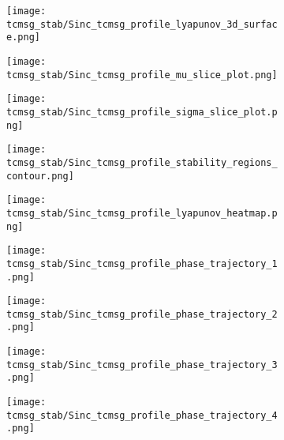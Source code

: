 \begin{figure}[H]
    \centering
    \begin{subfigure}[b]{0.31\textwidth}
        \centering
        \texttt{[image: tcmsg\_stab/Sinc\_tcmsg\_profile\_lyapunov\_3d\_surface.png]}
        \label{fig:tcmsg_stability1}
        \caption{}
    \end{subfigure}
    \begin{subfigure}[b]{0.31\textwidth}
        \centering
        \texttt{[image: tcmsg\_stab/Sinc\_tcmsg\_profile\_mu\_slice\_plot.png]}
        \label{fig:tcmsg_stability2}
        \caption{}
    \end{subfigure}
    \begin{subfigure}[b]{0.31\textwidth}
        \centering
        \texttt{[image: tcmsg\_stab/Sinc\_tcmsg\_profile\_sigma\_slice\_plot.png]}
        \label{fig:tcmsg_stability3}
        \caption{}
    \end{subfigure}
    
    \vspace{0.2cm} %
    
    \begin{subfigure}[b]{0.31\textwidth}
        \centering
        \texttt{[image: tcmsg\_stab/Sinc\_tcmsg\_profile\_stability\_regions\_contour.png]}
        \label{fig:tcmsg_stability4}
        \caption{}
    \end{subfigure}
    \begin{subfigure}[b]{0.31\textwidth}
        \centering
        \texttt{[image: tcmsg\_stab/Sinc\_tcmsg\_profile\_lyapunov\_heatmap.png]}
        \label{fig:tcmsg_stability5}
        \caption{}
    \end{subfigure}
    \begin{subfigure}[b]{0.31\textwidth}
        \centering
        \texttt{[image: tcmsg\_stab/Sinc\_tcmsg\_profile\_phase\_trajectory\_1.png]}
        \label{fig:tcmsg_stability6}
        \caption{}
    \end{subfigure}
    
    \vspace{0.2cm} %
    
    \begin{subfigure}[b]{0.31\textwidth}
        \centering
        \texttt{[image: tcmsg\_stab/Sinc\_tcmsg\_profile\_phase\_trajectory\_2.png]}
        \label{fig:tcmsg_stability7}
        \caption{}
    \end{subfigure}
    \begin{subfigure}[b]{0.31\textwidth}
        \centering
        \texttt{[image: tcmsg\_stab/Sinc\_tcmsg\_profile\_phase\_trajectory\_3.png]}
        \label{fig:tcmsg_stability8}
        \caption{}
    \end{subfigure}
    \begin{subfigure}[b]{0.31\textwidth}
        \centering
        \texttt{[image: tcmsg\_stab/Sinc\_tcmsg\_profile\_phase\_trajectory\_4.png]}
        \label{fig:tcmsg_stability9}
        \caption{}
    \end{subfigure}
    

\end{figure}
